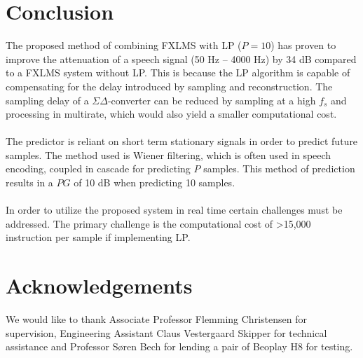 \section{Conclusion}
The proposed method of combining FXLMS with LP ($P=10$) has proven to improve the attenuation of a speech signal (50 Hz -- 4000 Hz) by 34 dB compared to a FXLMS system without LP. This is because the LP algorithm is capable of compensating for the delay introduced by sampling and reconstruction. The sampling delay of a $\Sigma\Delta$-converter can be reduced by sampling at a high $f_s$ and processing in multirate, which would also yield a smaller computational cost. %
\\\\
The predictor is reliant on short term stationary signals in order to predict future samples. The method used is Wiener filtering, which is often used in speech encoding, coupled in cascade for predicting $P$ samples. This method of prediction results in a $PG$ of 10 dB when predicting 10 samples.    
\\\\
In order to utilize the proposed system in real time certain challenges must be addressed. The primary challenge is the computational cost of >15,000 instruction per sample if implementing LP.    



\section*{Acknowledgements}
We would like to thank Associate Professor Flemming Christensen for supervision, Engineering Assistant Claus Vestergaard Skipper for technical assistance and Professor Søren Bech for lending a pair of Beoplay H8 for testing. 
